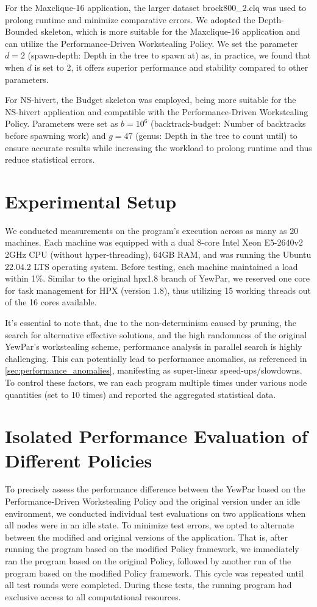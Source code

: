 \documentclass{mproj}
\begin{document}
For the Maxclique-16 application, the larger dataset brock800\_2.clq was used to prolong runtime and minimize comparative errors.
We adopted the Depth-Bounded skeleton, which is more suitable for the Maxclique-16 application and can utilize the Performance-Driven Workstealing Policy.
We set the parameter \(d = 2\) (spawn-depth: Depth in the tree to spawn at) as, in practice, we found that when \(d\) is set to 2, it offers superior performance and stability compared to other parameters.

For NS-hivert, the Budget skeleton was employed, being more suitable for the NS-hivert application and compatible with the Performance-Driven Workstealing Policy.
Parameters were set as \(b = 10^6\) (backtrack-budget: Number of backtracks before spawning work) and \(g = 47\) (genus: Depth in the tree to count until) to ensure accurate results while increasing the workload to prolong runtime and thus reduce statistical errors.

\section{Experimental Setup}
We conducted measurements on the program's execution across as many as 20 machines.
Each machine was equipped with a dual 8-core Intel Xeon E5-2640v2 2GHz CPU (without hyper-threading),
64GB RAM, and was running the Ubuntu 22.04.2 LTS operating system.
Before testing, each machine maintained a load within 1\%.
Similar to the original hpx1.8 branch of YewPar, we reserved one core for task management for HPX (version 1.8),
thus utilizing 15 working threads out of the 16 cores available.

It's essential to note that, due to the non-determinism caused by pruning, the search for alternative effective solutions, and the high randomness of the original YewPar's workstealing scheme,
performance analysis in parallel search is highly challenging.
This can potentially lead to performance anomalies, as referenced in \ref{sec:performance_anomalies},
manifesting as super-linear speed-ups/slowdowns.
To control these factors,
we ran each program multiple times under various node quantities (set to 10 times)
and reported the aggregated statistical data.

\section{Isolated Performance Evaluation of Different Policies}

To precisely assess the performance difference between the YewPar based on the Performance-Driven Workstealing Policy and the original version under an idle environment,
we conducted individual test evaluations on two applications when all nodes were in an idle state.
To minimize test errors,
we opted to alternate between the modified and original versions of the application.
That is, after running the program based on the modified Policy framework,
we immediately ran the program based on the original Policy,
followed by another run of the program based on the modified Policy framework.
This cycle was repeated until all test rounds were completed.
During these tests, the running program had exclusive access to all computational resources.
\end{document}
